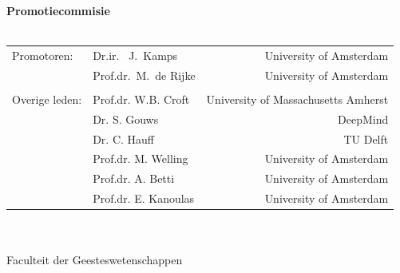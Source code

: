 {%
\clearpage
\noindent%
{\bf Promotiecommisie}\\
\\
\begin{tabular}[t]{@{}llr}
Promotoren:      
& Dr.ir. \ J.~Kamps  & University of Amsterdam \\  
& Prof.dr.\ M.~de Rijke  & University of Amsterdam \\  

\\
Overige leden: 
& Prof.dr. W.B. Croft   &  University of Massachusetts Amherst \\ 
& Dr. S. Gouws  &  DeepMind \\ 
& Dr. C. Hauff   &   TU Delft \\ 
& Prof.dr. M. Welling    &  University of Amsterdam \\ 
& Prof.dr. A. Betti    &  University of Amsterdam \\ 
& Prof.dr. E. Kanoulas    &  University of Amsterdam \\ 

\end{tabular}\\
\\
Faculteit der Geesteswetenschappen \\ %
} %
\par\vspace {5cm}

